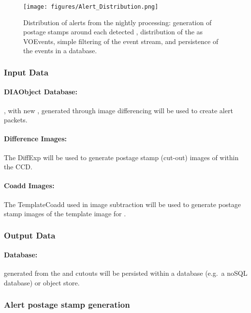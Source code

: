 \begin{figure}[th]
\begin{center}
\texttt{[image: figures/Alert\_Distribution.png]}
\caption{\label{fig:apAlertDistribution} Distribution of alerts from the nightly processing: generation of postage stamps around each detected \DIASource, distribution of the \DIAObjects as VOEvents, simple filtering of the event stream, and persistence of the events in a database.}
\end{center}
\end{figure}

\subsubsection{Input Data}
\label{sec:apADInput}

\paragraph*{DIAObject Database:} \DIAObjects, with new \DIASources, generated through image differencing will be used to create alert packets.

\paragraph*{Difference Images:} The DiffExp will be used to  generate postage stamp (cut-out) images of \DIASources within the CCD.

\paragraph*{Coadd Images:} The TemplateCoadd used in image subtraction will be used to  generate postage stamp images of the template image for \DIAObjects.


\subsubsection{Output Data}

\paragraph*{\VOEvent Database:} \VOEvents generated from the \DIAObjects and cutouts will be persisted within a database (e.g.\ a noSQL database) or object store.




\subsubsection{Alert postage stamp generation}

